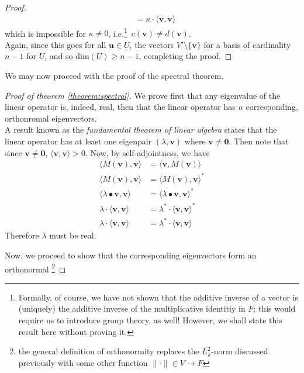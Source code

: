 \begin{proof}
\begin{align*}
				   &= \kappa \cdot \langle \mathbf{v},\mathbf{v}\rangle
		\end{align*}
		which is impossible for $\kappa \neq 0$, i.e.\footnote{Formally, of course, we 
		have not shown that the additive inverse of a vector is (uniquely) the additive 
		inverse of the multiplicative identitiy in $F$; this would require us to introduce 
		group theory, as well! However, we shall state this result here without proving 
		it.}\ $c(\mathbf{v}) \neq d(\mathbf{v})$.\\
		Again, since this goes for all $\mathbf{u} \in U$, the vectors $V' \setminus 
		\{\mathbf{v}\}$ for a basis of cardinality $n-1$ for $U$, and so $\mathrm{dim}(U) 
		\geq n-1$, completing the proof.
	\end{proof}
	We may now proceed with the proof of the spectral theorem.
	\begin{proof}[Proof of theorem \ref{theorem:spectral}]
		We prove first that any eigenvalue of the linear operator is, indeed, real, then
		that the linear operator has $n$ corresponding, orthonromal eigenvectors.\\
		A result known as the \emph{fundamental theorem of linear algebra} states that 
		the linear operator has at least one eigenpair $(\lambda, \mathbf{v})$ where 
		$\mathbf{v} \neq \mathbf{0}$. Then note that since $\mathbf{v} \neq\mathbf{0}$,
		$\langle \mathbf{v},\mathbf{v}\rangle > 0$. Now, by self-adjointness, we have
		\begin{align*}
			\langle M(\mathbf{v}),\mathbf{v}\rangle &= 
			\langle \mathbf{v},M(\mathbf{v})\rangle \\
			\langle M(\mathbf{v}),\mathbf{v}\rangle &= 
			\langle M(\mathbf{v}),\mathbf{v}\rangle^* \\
			\langle \lambda \bullet \mathbf{v},\mathbf{v}\rangle &= 
			\langle \lambda \bullet \mathbf{v},\mathbf{v}\rangle^* \\
			\lambda \cdot \langle\mathbf{v},\mathbf{v}\rangle &=
			\lambda^* \cdot \langle\mathbf{v},\mathbf{v}\rangle^* \\
			\lambda \cdot \langle\mathbf{v},\mathbf{v}\rangle &=
			\lambda^* \cdot \langle\mathbf{v},\mathbf{v}\rangle 
		\end{align*}
		Therefore $\lambda$ must be real.\par
		Now, we proceed to show that the corresponding eigenvectors form an orthonormal%
		\footnote{the general definition of orthonormity replaces the $L^2_\pi$-norm 
		discussed previously with some other function $\|\cdot\|\in V\rightarrow F$ 
}
\end{proof}
